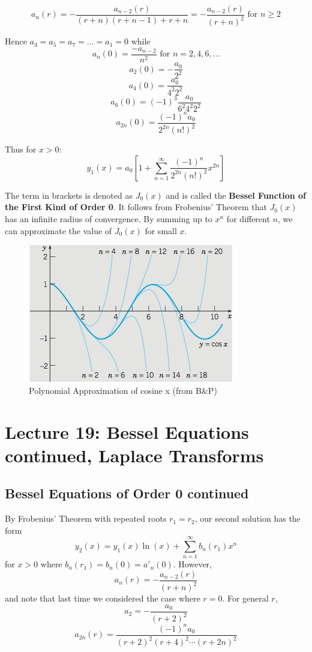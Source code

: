 \documentclass[11pt]{article}
\newcommand{\sumseriesone}{\sum_{n=1}^{\infty}}
\begin{document}
		$$ a_n (r) = - \frac{a_{n-2} (r)}{(r+n)(r+n-1)+r+n} = - \frac{a_{n-2}(r)}{(r+n)^2} \text{ for } n \geq 2 $$

	Hence $a_3 = a_5 = a_7 = \ldots = a_1 = 0$ while
		$$ a_n (0) = \frac{- a_{n-2}}{n^2} \text{ for } n = 2, 4, 6, \ldots $$
		$$ a_2 (0) = - \frac{a_0}{2^2} $$
		$$ a_4(0) = \frac{a_0}{4^2 2^2} $$
		$$ a_6 (0) = (-1)^3 \frac{a_0}{6^2 4^2 2^2} $$
		$$ \boxed{a_{2n} (0) = \frac{(-1)^n a_0}{2^{2n} (n!)^2}} $$

	Thus for $x > 0$:
		$$ y_1 (x) = a_0 \left[1 + \sumseriesone \frac{(-1)^n}{2^{2n} (n!)^2} x^{2n}\right] $$

	The term in brackets is denoted as $J_0 (x)$ and is called the \textbf{Bessel Function of the First Kind of Order 0}. It follows from Frobenius' Theorem that $J_0(x)$ has an infinite radius of convergence. By summing up to $x^n$ for different $n$, we can approximate the value of $J_0(x)$ for small $x$.

	\begin{figure}[H]
		\centering
		\includegraphics[scale=1]{L18besselorder0}
		\caption{Polynomial Approximation of cosine x (from B\&P)}
	\end{figure}

\section{Lecture 19: Bessel Equations continued, Laplace Transforms}
\subsection{Bessel Equations of Order 0 continued}
	By Frobenius' Theorem with repeated roots $r_1 = r_2$, our second solution has the form
		$$ y_2 (x) = y_1 (x) \ln (x) + \sumseriesone b_n (r_1) x^n $$
	for $x > 0$ where $b_n (r_1) = b_n (0) = a'_n (0)$. However,
		$$ a_n (r) = - \frac{a_{n-2} (r)}{(r+n)^2} $$
	and note that last time we considered the case where $r=0$. For general $r$,
		$$ a_2 = - \frac{a_0}{(r+2)^2} $$
		$$ a_{2n} (r) = \frac{(-1)^n a_0}{(r+2)^2 (r+4)^2 \cdots (r+2n)^2} $$
\end{document}
